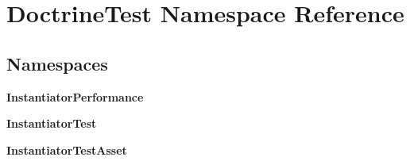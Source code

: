 \section{Doctrine\+Test Namespace Reference}
\label{namespace_doctrine_test}
\subsection*{Namespaces}
\begin{DoxyCompactItemize}
\item 
 {\bf Instantiator\+Performance}
\item 
 {\bf Instantiator\+Test}
\item 
 {\bf Instantiator\+Test\+Asset}
\end{DoxyCompactItemize}
